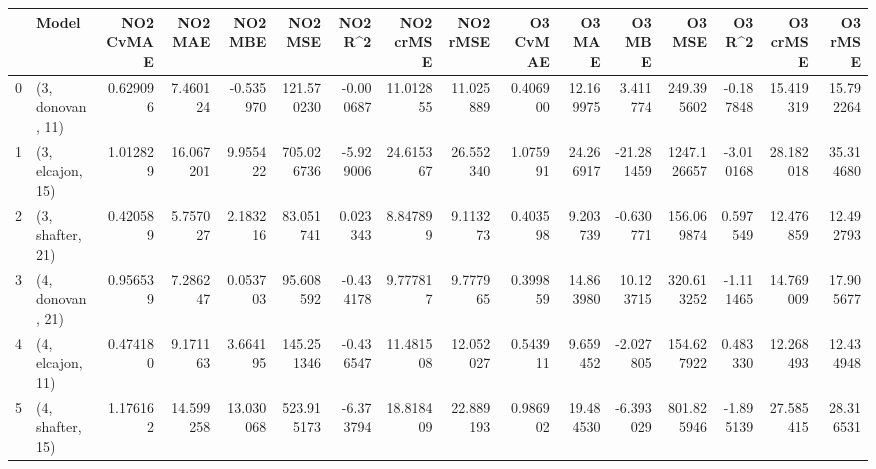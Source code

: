 \begin{tabular}{llrrrrrrrrrrrrrr}
\toprule
{} &             Model &  NO2 CvMAE &    NO2 MAE &    NO2 MBE &     NO2 MSE &   NO2 R\textasciicircum2 &  NO2 crMSE &   NO2 rMSE &  O3 CvMAE &     O3 MAE &     O3 MBE &       O3 MSE &    O3 R\textasciicircum2 &   O3 crMSE &    O3 rMSE \\
\midrule
0 &  (3, donovan, 11) &   0.629096 &   7.460124 &  -0.535970 &  121.570230 & -0.000687 &  11.012855 &  11.025889 &  0.406900 &  12.169975 &   3.411774 &   249.395602 & -0.187848 &  15.419319 &  15.792264 \\
1 &  (3, elcajon, 15) &   1.012829 &  16.067201 &   9.955422 &  705.026736 & -5.929006 &  24.615367 &  26.552340 &  1.075991 &  24.266917 & -21.281459 &  1247.126657 & -3.010168 &  28.182018 &  35.314680 \\
2 &  (3, shafter, 21) &   0.420589 &   5.757027 &   2.183216 &   83.051741 &  0.023343 &   8.847899 &   9.113273 &  0.403598 &   9.203739 &  -0.630771 &   156.069874 &  0.597549 &  12.476859 &  12.492793 \\
3 &  (4, donovan, 21) &   0.956539 &   7.286247 &   0.053703 &   95.608592 & -0.434178 &   9.777817 &   9.777965 &  0.399859 &  14.863980 &  10.123715 &   320.613252 & -1.111465 &  14.769009 &  17.905677 \\
4 &  (4, elcajon, 11) &   0.474180 &   9.171163 &   3.664195 &  145.251346 & -0.436547 &  11.481508 &  12.052027 &  0.543911 &   9.659452 &  -2.027805 &   154.627922 &  0.483330 &  12.268493 &  12.434948 \\
5 &  (4, shafter, 15) &   1.176162 &  14.599258 &  13.030068 &  523.915173 & -6.373794 &  18.818409 &  22.889193 &  0.986902 &  19.484530 &  -6.393029 &   801.825946 & -1.895139 &  27.585415 &  28.316531 \\
\bottomrule
\end{tabular}
